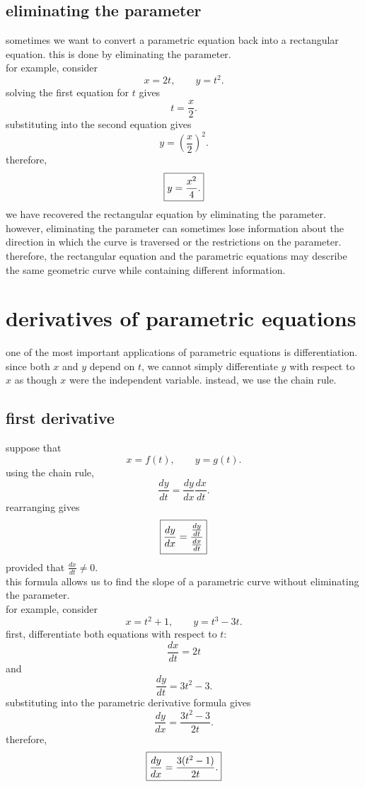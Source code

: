 \documentclass{article}
\newcommand{\mybox}[1]{\fbox{\ensuremath{\displaystyle #1}}}
\begin{document}
\subsection{eliminating the parameter}

sometimes we want to convert a parametric equation back into a rectangular equation. this is done by eliminating the parameter.\\

for example, consider
\[
x=2t,\qquad y=t^2.
\]
solving the first equation for $t$ gives
\[
t=\frac{x}{2}.
\]
substituting into the second equation gives
\[
y=\left(\frac{x}{2}\right)^2.
\]
therefore,
\[
\mybox{y=\frac{x^2}{4}.}
\]
we have recovered the rectangular equation by eliminating the parameter.\\

however, eliminating the parameter can sometimes lose information about the direction in which the curve is traversed or the restrictions on the parameter. therefore, the rectangular equation and the parametric equations may describe the same geometric curve while containing different information.\\

\newpage

\section{derivatives of parametric equations}

one of the most important applications of parametric equations is differentiation. since both $x$ and $y$ depend on $t$, we cannot simply differentiate $y$ with respect to $x$ as though $x$ were the independent variable. instead, we use the chain rule.\\

\subsection{first derivative}

suppose that
\[
x=f(t),\qquad y=g(t).
\]
using the chain rule,
\[
\frac{dy}{dt}
=
\frac{dy}{dx}\frac{dx}{dt}.
\]
rearranging gives
\[
\mybox{
\frac{dy}{dx}
=
\frac{\frac{dy}{dt}}{\frac{dx}{dt}}
}
\]
provided that $\frac{dx}{dt}\neq0$.\\

this formula allows us to find the slope of a parametric curve without eliminating the parameter.\\

for example, consider
\[
x=t^2+1,\qquad y=t^3-3t.
\]
first, differentiate both equations with respect to $t$:
\[
\frac{dx}{dt}=2t
\]
and
\[
\frac{dy}{dt}=3t^2-3.
\]
substituting into the parametric derivative formula gives
\[
\frac{dy}{dx}
=
\frac{3t^2-3}{2t}.
\]
therefore,
\[
\mybox{
\frac{dy}{dx}
=
\frac{3(t^2-1)}{2t}.
}
\]
\end{document}
